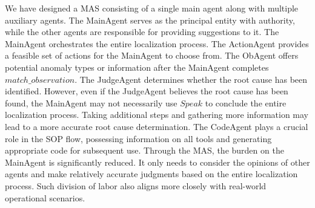 We have designed a MAS consisting of a single main agent along with multiple auxiliary agents. The MainAgent serves as the principal entity with authority, while the other agents are responsible for providing suggestions to it. The MainAgent orchestrates the entire localization process. The ActionAgent provides a feasible set of actions for the MainAgent to choose from. The ObAgent offers potential anomaly types or information after the MainAgent completes $match\_observation$. The JudgeAgent determines whether the root cause has been identified. However, even if the JudgeAgent believes the root cause has been found, the MainAgent may not necessarily use $Speak$ to conclude the entire localization process. Taking additional steps and gathering more information may lead to a more accurate root cause determination. The CodeAgent plays a crucial role in the SOP flow, possessing information on all tools and generating appropriate code for subsequent use. Through the MAS, the burden on the MainAgent is significantly reduced. It only needs to consider the opinions of other agents and make relatively accurate judgments based on the entire localization process. Such division of labor also aligns more closely with real-world operational scenarios.